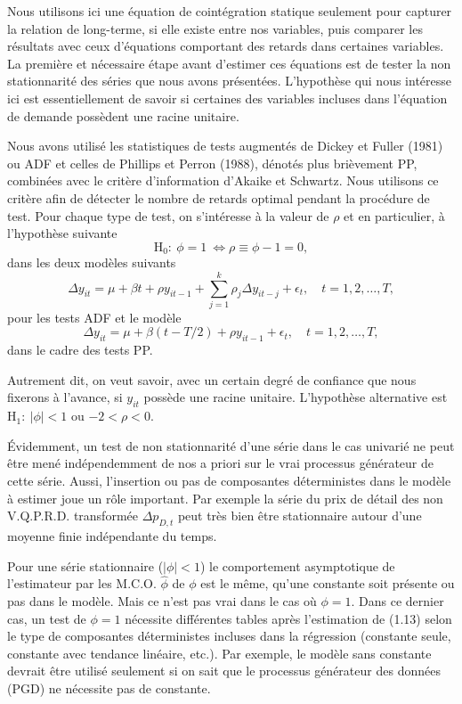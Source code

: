 \documentclass{article}
\begin{document}
Nous utilisons ici une \'equation de coint\'egration statique
seulement pour capturer la relation de long-terme, si elle existe
entre nos variables, puis comparer les r\'esultats avec ceux
d'\'equations comportant des retards dans certaines variables. La
premi\`ere et n\'ecessaire \'etape avant d'estimer ces \'equations
est de tester la non stationnarit\'e des s\'eries que nous avons
pr\'esent\'ees. L'hypoth\`ese qui nous int\'eresse ici est
essentiellement de savoir si certaines des variables incluses dans
l'\'equation de demande poss\`edent une racine unitaire.
\bigskip

Nous avons utilis\'e les statistiques de tests augment\'es de Dickey
et Fuller (1981) ou ADF et celles de Phillips et Perron (1988),
d\'enot\'es plus bri\`evement PP, combin\'ees avec le crit\`ere
d'information d'Akaike et Schwartz. Nous utilisons ce crit\`ere afin
de d\'etecter le nombre de retards optimal pendant la proc\'edure de
test. Pour chaque type de test, on s'int\'eresse \`a la valeur de
$\rho$ et en particulier, \`a l'hypoth\`ese suivante
$$\textrm{H}_0:\ \phi=1\ \Leftrightarrow \rho\equiv \phi-1=0,$$ dans
les deux mod\`eles suivants
\begin{equation}\Delta y_{it}=\mu+\beta t+\rho y_{it-1}+
\sum_{j=1}^k\rho_j\Delta y_{it-j}+\epsilon_t,\quad
t=1,2,\ldots,T,\end{equation} pour les tests ADF et le mod\`ele
\begin{equation}\Delta y_{it}=\mu+\beta(t-T/2)+\rho y_{it-1}+
\epsilon_t,\quad t=1,2,\ldots,T,\end{equation} dans le cadre des
tests PP.

Autrement dit, on veut savoir, avec un certain degr\'e de confiance
que nous fixerons \`a l'avance, si $y_{it}$ poss\`ede une racine
unitaire. L'hypoth\`ese alternative est $\textrm{H}_1:\ |\phi|<1$ ou
$-2<\rho<0$.

\'Evidemment, un test de non stationnarit\'e d'une s\'erie dans le
cas univari\'e ne peut \^etre men\'e ind\'ependemment de nos a
priori sur le vrai processus g\'en\'erateur de cette s\'erie. Aussi,
l'insertion ou pas de composantes d\'eterministes dans le mod\`ele
\`a estimer joue un r\^ole important. Par exemple la s\'erie du prix
de d\'etail des non V.Q.P.R.D. transform\'ee $\Delta p_{D,t}$ peut
tr\`es bien \^etre stationnaire autour d'une moyenne finie
ind\'ependante du temps.

Pour une s\'erie stationnaire ($|\phi|<1$) le comportement
asymptotique de l'estimateur par les M.C.O. $\hat{\phi}$ de $\phi$
est le m\^eme, qu'une constante soit pr\'esente ou pas dans le
mod\`ele. Mais ce n'est pas vrai dans le cas o\`u $\phi=1$. Dans ce
dernier cas, un test de $\phi=1$ n\'ecessite diff\'erentes tables
apr\`es l'estimation de (1.13) selon le type de composantes
d\'eterministes incluses dans la r\'egression (constante seule,
constante avec tendance lin\'eaire, etc.). Par exemple, le mod\`ele
sans constante devrait \^etre utilis\'e seulement si on sait que le
processus g\'en\'erateur des donn\'ees (PGD) ne n\'ecessite pas de
constante.
\end{document}

